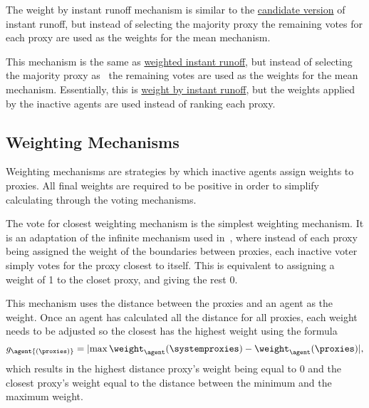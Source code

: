 \label{para:avg-instant-runoff}
The weight by instant runoff mechanism is similar to the
\hyperref[para:cand-instant-runoff]{candidate version} of instant
runoff, but instead of selecting the majority proxy the remaining votes for
each proxy are used as the weights for the mean mechanism.

\label{para:avg-weighted-instant-runoff}
This mechanism is the same as
\hyperref[para:candidate-weighted-instant-runoff]{weighted instant runoff},
but instead of selecting the majority proxy as \systemtruth\ the remaining votes
are used as the weights for the mean mechanism.
Essentially, this is
\hyperref[para:avg-instant-runoff]{weight by instant runoff}, but the weights
applied by the inactive agents are used instead of ranking each proxy.

\subsection{Weighting Mechanisms}\label{subsec:weighting-mechanisms}
Weighting mechanisms are strategies by which inactive agents assign weights
to proxies.
All final weights are required to be positive in order to simplify
calculating \systemtruth through the voting mechanisms.

\label{para:closest}
The vote for closest weighting mechanism is the simplest weighting mechanism.
It is an adaptation of the infinite mechanism used in~\cite{Cohensius2017},
where instead of each proxy being assigned the weight of the boundaries
between proxies, each inactive voter simply votes for the proxy closest to
itself.
This is equivalent to assigning a weight of 1 to the closet proxy, and giving
the rest 0.

\label{para:distance-voting}
This mechanism uses the distance between the proxies and an agent as the weight.
Once an agent has calculated all the distance for all proxies,
each weight needs to be adjusted so the closest has the highest weight using
the formula
\begin{equation}
    g_\agent{(\proxies)} = \lvert
    \max{\weight_{\agent}{(\systemproxies)}} - \weight_{\agent}{(\proxies)}
    \rvert
    \text{,}\label{eq:distance-voting-adjustment}
\end{equation}
which results in the highest distance proxy's weight being equal to 0 and the
closest proxy's weight equal to the distance between the minimum and the
maximum weight.

